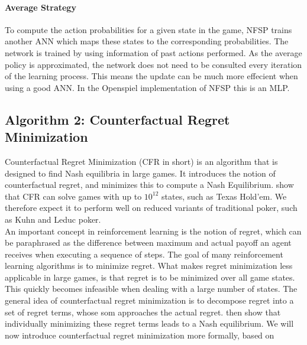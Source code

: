 \documentclass[10pt,a4paper]{article}
\begin{document}
\paragraph{Average Strategy}
To compute the action probabilities for a given state in the game, NFSP trains another ANN which maps these states to the corresponding probabilities. The network is trained by using information of past actions performed. As the average policy is approximated, the network does not need to be consulted every iteration of the learning process. This means the update can be much more effecient when using a good ANN.
In the Openspiel implementation of NFSP this is an MLP.
\subsection{Algorithm 2: Counterfactual Regret Minimization}
\label{sub:cfr}
Counterfactual Regret Minimization (CFR in short) is an algorithm that is designed to find Nash equilibria in large games. It introduces the notion of counterfactual regret, and minimizes this to compute a Nash Equilibrium. \citeauthor{cfr} \citep{cfr} show that CFR can solve games with up to $10^{12}$ states, such as Texas Hold'em. We therefore expect it to perform well on reduced variants of traditional poker, such as Kuhn and Leduc poker.\\

An important concept in reinforcement learning is the notion of regret, which can be paraphrased as the difference between maximum and actual payoff an agent receives when executing a sequence of steps. The goal of many reinforcement learning algorithms is to minimize regret. What makes regret minimization less applicable in large games, is that regret is to be minimized over all game states. This quickly becomes infeasible when dealing with a large number of states. The general idea of counterfactual regret minimization is to decompose regret into a set of regret terms, whose som approaches the actual regret. \citeauthor{cfr} then show that individually minimizing these regret terms leads to a Nash equilibrium. We will now introduce counterfactual regret minimization more formally, based on \citep{cfr_for_beginners}\\
\end{document}
